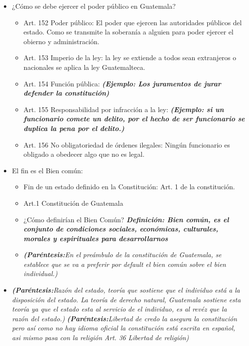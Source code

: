 \begin{itemize}
    
    \item ¿Cómo se debe ejercer el poder público en Guatemala?
    \begin{itemize}
        \item Art. 152 Poder público: El poder que ejercen las autoridades públicos del estado. Como se transmite la soberanía a alguien para poder ejercer el obierno y administración.
        \item Art. 153 Imperio de la ley: la ley se extiende a todos sean extranjeros o nacionales se aplica la ley Guatemalteca.
        \item Art. 154  Función pública: \textbf{\emph{(Ejemplo: Los juramentos de jurar defender la constitución)}}
        \item Art. 155 Responsabilidad por infracción a la ley: \textbf{\emph{(Ejemplo: si un funcionario comete un delito, por el hecho de ser funcionario se duplica la pena por el delito.)}}
        \item Art. 156 No obligatoriedad de órdenes ilegales: Ningún funcionario es obligado a obedecer algo que no es legal.
    \end{itemize}

    
    \item El fin es el Bien común: 
    \begin{itemize}
        \item Fin de un estado definido en la Constitución: Art. 1 de la constitución. 
        \item Art.1 Constitución de Guatemala
        \item ¿Cómo definirían el Bien Común? \textbf{\emph{Definición: Bien común, es el conjunto de condiciones sociales, económicas, culturales, morales y espirituales para desarrollarnos}}
        \item \emph{\textbf{(Paréntesis:}En el preámbulo de la constitución de Guatemala, se establece que se va a preferir por default el bien común sobre el bien individual.)}
    \end{itemize}

    \item \emph{\textbf{(Paréntesis:}Razón del estado, teoría que sostiene que el individuo está a la disposición del estado. La teoría de derecho natural, Guatemala sostiene esta teoría ya que el estado esta al servicio de el individuo, es al revéz que la razón del estado.)} \emph{\textbf{(Paréntesis:}Libertad de credo la asegura la constitución pero así como no hay idioma oficial la constitución está escrita en español, asi mismo pasa con la religión Art. 36 Libertad de religión)}
    

\end{itemize}
